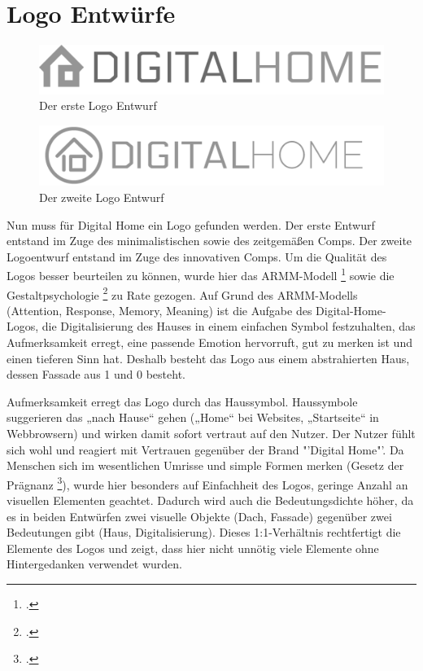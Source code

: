 \section{Logo Entwürfe}
\begin{figure} [hp]
\includegraphics[width=\textwidth]{./img/logo1.png}
\caption{Der erste Logo Entwurf}
\label{logo1}
\end{figure}
\begin{figure} [hp]
\includegraphics[width=\textwidth]{./img/logo2.png}
\caption{Der zweite Logo Entwurf}
\label{logo2}
\end{figure}
Nun muss für Digital Home ein Logo gefunden werden. Der erste Entwurf entstand im Zuge des minimalistischen sowie des zeitgemäßen Comps. Der zweite Logoentwurf entstand im Zuge des innovativen Comps. Um die Qualität des Logos besser beurteilen zu können, wurde hier das ARMM-Modell \footcite[vgl.][]{ARMM:model} sowie die Gestaltpsychologie \footcite[vgl.][]{gestalt} zu Rate gezogen. Auf Grund des ARMM-Modells (Attention, Response, Memory, Meaning) ist die Aufgabe des Digital-Home-Logos, die Digitalisierung des Hauses in einem einfachen Symbol festzuhalten, das Aufmerksamkeit erregt, eine passende Emotion hervorruft, gut zu merken ist und einen tieferen Sinn hat. Deshalb besteht das Logo aus einem abstrahierten Haus, dessen Fassade aus 1 und 0 besteht.

Aufmerksamkeit erregt das Logo durch das Haussymbol. Haussymbole suggerieren das „nach Hause“ gehen („Home“ bei Websites, „Startseite“ in Webbrowsern) und wirken damit sofort vertraut auf den Nutzer. Der Nutzer fühlt sich wohl und reagiert mit Vertrauen gegenüber der Brand "'Digital Home"'. Da Menschen sich im wesentlichen Umrisse und simple Formen merken (Gesetz der Prägnanz \footcite[vgl.][]{gestalt}), wurde hier besonders auf Einfachheit des Logos, geringe Anzahl an visuellen Elementen geachtet. Dadurch wird auch die Bedeutungsdichte höher, da es in beiden Entwürfen zwei visuelle Objekte (Dach, Fassade) gegenüber zwei Bedeutungen gibt (Haus, Digitalisierung). Dieses 1:1-Verhältnis rechtfertigt die Elemente des Logos und zeigt, dass hier nicht unnötig viele Elemente ohne Hintergedanken verwendet wurden.

